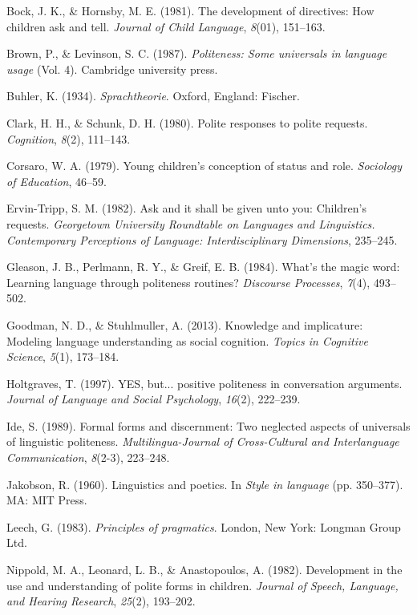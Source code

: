\documentclass[10pt, letterpaper]{article}
\begin{document}
\hypertarget{ref-bock1981}{}
Bock, J. K., \& Hornsby, M. E. (1981). The development of directives:
How children ask and tell. \emph{Journal of Child Language},
\emph{8}(01), 151--163.

\hypertarget{ref-brown1987}{}
Brown, P., \& Levinson, S. C. (1987). \emph{Politeness: Some universals
in language usage} (Vol. 4). Cambridge university press.

\hypertarget{ref-buhler1934}{}
Buhler, K. (1934). \emph{Sprachtheorie}. Oxford, England: Fischer.

\hypertarget{ref-clark1980}{}
Clark, H. H., \& Schunk, D. H. (1980). Polite responses to polite
requests. \emph{Cognition}, \emph{8}(2), 111--143.

\hypertarget{ref-corsaro1979}{}
Corsaro, W. A. (1979). Young children's conception of status and role.
\emph{Sociology of Education}, 46--59.

\hypertarget{ref-ervin1982}{}
Ervin-Tripp, S. M. (1982). Ask and it shall be given unto you:
Children's requests. \emph{Georgetown University Roundtable on Languages
and Linguistics. Contemporary Perceptions of Language: Interdisciplinary
Dimensions}, 235--245.

\hypertarget{ref-gleason1984}{}
Gleason, J. B., Perlmann, R. Y., \& Greif, E. B. (1984). What's the
magic word: Learning language through politeness routines?
\emph{Discourse Processes}, \emph{7}(4), 493--502.

\hypertarget{ref-goodman2013}{}
Goodman, N. D., \& Stuhlmuller, A. (2013). Knowledge and implicature:
Modeling language understanding as social cognition. \emph{Topics in
Cognitive Science}, \emph{5}(1), 173--184.

\hypertarget{ref-holtgraves1997}{}
Holtgraves, T. (1997). YES, but... positive politeness in conversation
arguments. \emph{Journal of Language and Social Psychology},
\emph{16}(2), 222--239.

\hypertarget{ref-ide1989}{}
Ide, S. (1989). Formal forms and discernment: Two neglected aspects of
universals of linguistic politeness. \emph{Multilingua-Journal of
Cross-Cultural and Interlanguage Communication}, \emph{8}(2-3),
223--248.

\hypertarget{ref-jakobson1960}{}
Jakobson, R. (1960). Linguistics and poetics. In \emph{Style in
language} (pp. 350--377). MA: MIT Press.

\hypertarget{ref-leech1983}{}
Leech, G. (1983). \emph{Principles of pragmatics}. London, New York:
Longman Group Ltd.

\hypertarget{ref-nippold1982}{}
Nippold, M. A., Leonard, L. B., \& Anastopoulos, A. (1982). Development
in the use and understanding of polite forms in children. \emph{Journal
of Speech, Language, and Hearing Research}, \emph{25}(2), 193--202.
\end{document}
